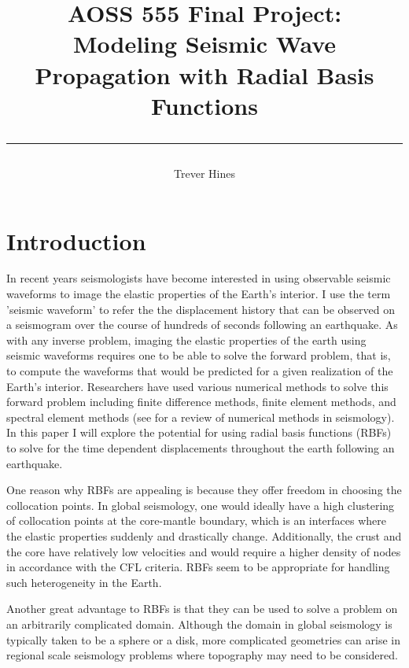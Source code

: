 \documentclass[12pt]{article}
\title{	
AOSS 555 Final Project:\\
Modeling Seismic Wave Propagation with Radial Basis Functions\\
\author{Trever Hines}
\rule{\headwidth}{1.0pt}
}
\begin{document}
\maketitle
\section*{Introduction}
 
In recent years seismologists have become interested in using
observable seismic waveforms to image the elastic properties of the
Earth's interior.  I use the term 'seismic waveform' to refer the the
displacement history that can be observed on a seismogram over the
course of hundreds of seconds following an earthquake.  As with any
inverse problem, imaging the elastic properties of the earth using
seismic waveforms requires one to be able to solve the forward
problem, that is, to compute the waveforms that would be predicted for
a given realization of the Earth's interior.  Researchers have used
various numerical methods to solve this forward problem including
finite difference methods, finite element methods, and spectral
element methods (see \citet{F2011} for a review of numerical methods
in seismology).  In this paper I will explore the potential for using
radial basis functions (RBFs) to solve for the time dependent
displacements throughout the earth following an earthquake.
 
One reason why RBFs are appealing is because they offer freedom in
choosing the collocation points.  In global seismology, one would
ideally have a high clustering of collocation points at the
core-mantle boundary, which is an interfaces where the elastic
properties suddenly and drastically change.  Additionally, the crust
and the core have relatively low velocities and would require a higher
density of nodes in accordance with the CFL criteria.  RBFs seem to be
appropriate for handling such heterogeneity in the Earth.

Another great advantage to RBFs is that they can be used to solve a
problem on an arbitrarily complicated domain.  Although the domain in
global seismology is typically taken to be a sphere or a disk, more
complicated geometries can arise in regional scale seismology problems
where topography may need to be considered.
\end{document}
